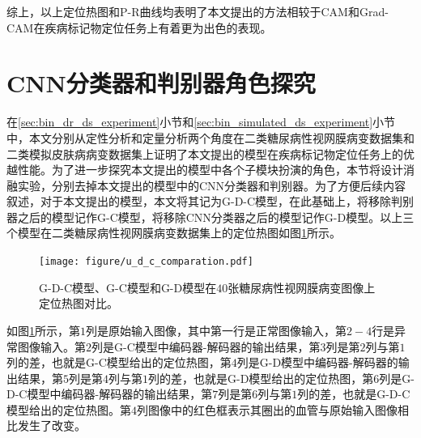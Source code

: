 综上，以上定位热图和P-R曲线均表明了本文提出的方法相较于CAM和Grad-CAM在疾病标记物定位任务上有着更为出色的表现。
\section{CNN分类器和判别器角色探究}\label{sec:g_c_g_d_g_d_c_comparsion}
在\ref{sec:bin_dr_ds_experiment}小节和\ref{sec:bin_simulated_ds_experiment}小节中，本文分别从定性分析和定量分析两个角度在二类糖尿病性视网膜病变数据集和二类模拟皮肤病病变数据集上证明了本文提出的模型在疾病标记物定位任务上的优越性能。为了进一步探究本文提出的模型中各个子模块扮演的角色，本节将设计消融实验，分别去掉本文提出的模型中的CNN分类器和判别器。为了方便后续内容叙述，对于本文提出的模型，本文将其记为G-D-C模型，在此基础上，将移除判别器之后的模型记作G-C模型，将移除CNN分类器之后的模型记作G-D模型。以上三个模型在二类糖尿病性视网膜病变数据集上的定位热图如图\ref{fig:u_d_c_comparation}所示。
\begin{figure}[h]
	\centering
	\texttt{[image: figure/u\_d\_c\_comparation.pdf]}
	\caption[G-D-C模型、G-C模型和G-D模型定位热图对比]{G-D-C模型、G-C模型和G-D模型在$40$张糖尿病性视网膜病变图像上定位热图对比。} 
	\label{fig:u_d_c_comparation}
\end{figure}

如图\ref{fig:u_d_c_comparation}所示，第$1$列是原始输入图像，其中第一行是正常图像输入，第$2-4$行是异常图像输入。第$2$列是G-C模型中编码器-解码器的输出结果，第$3$列是第$2$列与第$1$列的差，也就是G-C模型给出的定位热图，第$4$列是G-D模型中编码器-解码器的输出结果，第$5$列是第$4$列与第$1$列的差，也就是G-D模型给出的定位热图，第$6$列是G-D-C模型中编码器-解码器的输出结果，第$7$列是第$6$列与第$1$列的差，也就是G-D-C模型给出的定位热图。第$4$列图像中的红色框表示其圈出的血管与原始输入图像相比发生了改变。

